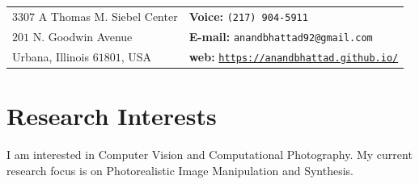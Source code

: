 \documentclass[margin,line]{res}
\begin{document}
\begin{resume}
\section{\large {}}
\begin{tabular}{@{}p{3in}p{2.84in}}
$3307$ A Thomas M. Siebel Center             & \hfill {\bf Voice:}  {\tt (217) 904-5911}\\            
$201$ N. Goodwin Avenue   & \hfill {\bf E-mail:} {\tt anandbhattad92@gmail.com}\\         
Urbana, Illinois $61801$, USA  &\hfill  {\bf web:} \href{https://anandbhattad.github.io/}{\tt https://anandbhattad.github.io/}\\     
\end{tabular}

\section{\sc \large Research Interests}
I am interested in Computer Vision and Computational Photography. My current research focus is on Photorealistic Image Manipulation and Synthesis.


\end{resume}
\end{document}
